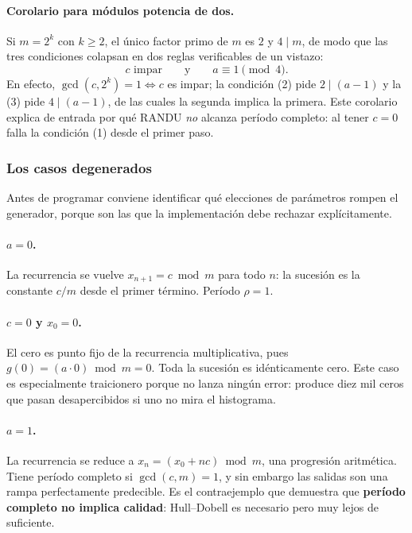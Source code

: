 \paragraph{Corolario para módulos potencia de dos.} Si $m = 2^k$ con $k \ge 2$,
el único factor primo de $m$ es $2$ y $4 \mid m$, de modo que las tres
condiciones colapsan en dos reglas verificables de un vistazo:
\begin{equation}
  c \text{ impar}
  \qquad\text{y}\qquad
  a \equiv 1 \pmod 4 .
  \label{eq:hd-potencia2}
\end{equation}
En efecto, $\gcd(c, 2^k) = 1 \iff c$ es impar; la condición (2) pide
$2 \mid (a-1)$ y la (3) pide $4 \mid (a-1)$, de las cuales la segunda implica la
primera. Este corolario explica de entrada por qué RANDU \emph{no} alcanza
período completo: al tener $c = 0$ falla la condición (1) desde el primer paso.

\subsubsection{Los casos degenerados}
\label{sec:degenerados}

Antes de programar conviene identificar qué elecciones de parámetros rompen el
generador, porque son las que la implementación debe rechazar explícitamente.

\paragraph{$a = 0$.} La recurrencia se vuelve $x_{n+1} = c \bmod m$ para todo
$n$: la sucesión es la constante $c/m$ desde el primer término. Período
$\rho = 1$.

\paragraph{$c = 0$ y $x_0 = 0$.} El cero es punto fijo de la recurrencia
multiplicativa, pues $g(0) = (a \cdot 0) \bmod m = 0$. Toda la sucesión es
idénticamente cero. Este caso es especialmente traicionero porque no lanza
ningún error: produce diez mil ceros que pasan desapercibidos si uno no mira el
histograma.

\paragraph{$a = 1$.} La recurrencia se reduce a $x_n = (x_0 + nc) \bmod m$, una
progresión aritmética. Tiene período completo si $\gcd(c,m)=1$, y sin embargo
las salidas son una rampa perfectamente predecible. Es el contraejemplo que
demuestra que \textbf{período completo no implica calidad}: Hull--Dobell es
necesario pero muy lejos de suficiente.

